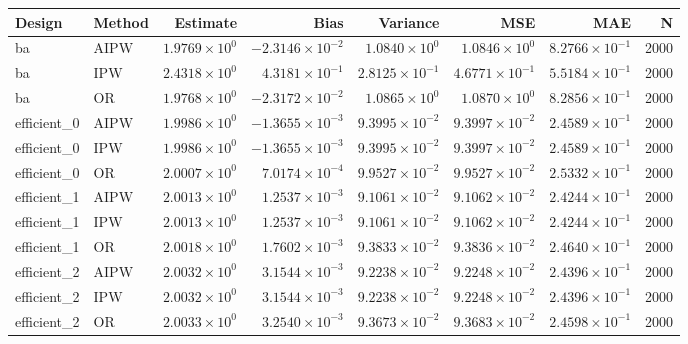 \begin{table}[ht]
\centering
\begin{tabular}{llrrrrrr}
  \toprule
Design & Method & Estimate & Bias & Variance & MSE & MAE & N \\ 
  \midrule
ba & AIPW & $1.9769 \times 10^{0}$ & $-2.3146 \times 10^{-2}$ & $1.0840 \times 10^{0}$ & $1.0846 \times 10^{0}$ & $8.2766 \times 10^{-1}$ & 2000 \\ 
  ba & IPW & $2.4318 \times 10^{0}$ & $4.3181 \times 10^{-1}$ & $2.8125 \times 10^{-1}$ & $4.6771 \times 10^{-1}$ & $5.5184 \times 10^{-1}$ & 2000 \\ 
  ba & OR & $1.9768 \times 10^{0}$ & $-2.3172 \times 10^{-2}$ & $1.0865 \times 10^{0}$ & $1.0870 \times 10^{0}$ & $8.2856 \times 10^{-1}$ & 2000 \\ 
   \midrule
efficient\_0 & AIPW & $1.9986 \times 10^{0}$ & $-1.3655 \times 10^{-3}$ & $9.3995 \times 10^{-2}$ & $9.3997 \times 10^{-2}$ & $2.4589 \times 10^{-1}$ & 2000 \\ 
  efficient\_0 & IPW & $1.9986 \times 10^{0}$ & $-1.3655 \times 10^{-3}$ & $9.3995 \times 10^{-2}$ & $9.3997 \times 10^{-2}$ & $2.4589 \times 10^{-1}$ & 2000 \\ 
  efficient\_0 & OR & $2.0007 \times 10^{0}$ & $7.0174 \times 10^{-4}$ & $9.9527 \times 10^{-2}$ & $9.9527 \times 10^{-2}$ & $2.5332 \times 10^{-1}$ & 2000 \\ 
   \midrule
efficient\_1 & AIPW & $2.0013 \times 10^{0}$ & $1.2537 \times 10^{-3}$ & $9.1061 \times 10^{-2}$ & $9.1062 \times 10^{-2}$ & $2.4244 \times 10^{-1}$ & 2000 \\ 
  efficient\_1 & IPW & $2.0013 \times 10^{0}$ & $1.2537 \times 10^{-3}$ & $9.1061 \times 10^{-2}$ & $9.1062 \times 10^{-2}$ & $2.4244 \times 10^{-1}$ & 2000 \\ 
  efficient\_1 & OR & $2.0018 \times 10^{0}$ & $1.7602 \times 10^{-3}$ & $9.3833 \times 10^{-2}$ & $9.3836 \times 10^{-2}$ & $2.4640 \times 10^{-1}$ & 2000 \\ 
   \midrule
efficient\_2 & AIPW & $2.0032 \times 10^{0}$ & $3.1544 \times 10^{-3}$ & $9.2238 \times 10^{-2}$ & $9.2248 \times 10^{-2}$ & $2.4396 \times 10^{-1}$ & 2000 \\ 
  efficient\_2 & IPW & $2.0032 \times 10^{0}$ & $3.1544 \times 10^{-3}$ & $9.2238 \times 10^{-2}$ & $9.2248 \times 10^{-2}$ & $2.4396 \times 10^{-1}$ & 2000 \\ 
  efficient\_2 & OR & $2.0033 \times 10^{0}$ & $3.2540 \times 10^{-3}$ & $9.3673 \times 10^{-2}$ & $9.3683 \times 10^{-2}$ & $2.4598 \times 10^{-1}$ & 2000 \\ 

\end{tabular}
\end{table}
